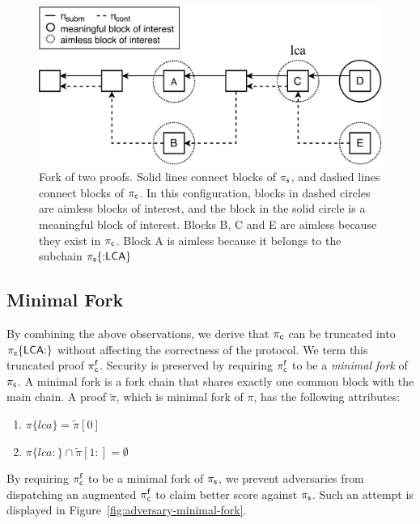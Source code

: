 \begin{figure}[H]
    \begin{center}
        \includegraphics[width=0.6\columnwidth]{figures/boi-position.pdf}
    \end{center}
    \caption{Fork of two proofs.
    Solid lines connect blocks of $\mathsf{\pi_{s}}$,
    and dashed lines connect blocks of $\mathsf{\pi_{c}}$.
    In this configuration,
    blocks in dashed circles are aimless blocks of interest, and the block
    in the solid circle is a meaningful block of interest. Blocks B, C and E are
    aimless because they exist in $\mathsf{\pi_{c}}$. Block A is aimless because it
    belongs to the subchain $\mathsf{\pi_{s}}\{{:}\mathsf{LCA}\}$
    }
    \label{fig:boi-position}
\end{figure}


\subsection{Minimal Fork} By combining the above observations, we
derive that $\mathsf{\pi_{c}}$ can be truncated into $\mathsf{\pi_{c}}\{\mathsf{LCA}{:}\}$ without affecting
the correctness of the protocol. We term this truncated proof $\mathsf{\pi_{c}^{f}}$.
Security is preserved by requiring $\mathsf{\pi_{c}^{f}}$ to be a \emph{minimal fork} of
$\mathsf{\pi_{s}}$. A minimal fork is a fork chain that shares exactly one common block
with the main chain. A proof $\tilde\pi$, which is minimal fork of $\pi$, has
the following attributes:

\begin{enumerate}
\item $\pi\{lca\} = \tilde\pi[0]$
\item $\pi\{lca{:}\} \cap \tilde\pi[1{:}] = \emptyset$
\end{enumerate}

By requiring $\mathsf{\pi_{c}^{f}}$ to be a minimal fork of $\mathsf{\pi_{s}}$, we prevent adversaries
from dispatching an augmented $\mathsf{\pi_{c}^{f}}$ to claim better score against $\mathsf{\pi_{s}}$.
Such an attempt is displayed in Figure~\ref{fig:adversary-minimal-fork}.

